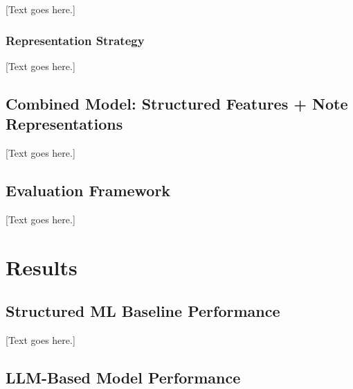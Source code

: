 \documentclass[12pt, a4paper]{article}
\begin{document}
[Text goes here.]

\subsubsection{Representation Strategy}

[Text goes here.]

\subsection{Combined Model: Structured Features + Note Representations}

[Text goes here.]

\subsection{Evaluation Framework}

[Text goes here.]

\section{Results}

\subsection{Structured ML Baseline Performance}

[Text goes here.]

\subsection{LLM-Based Model Performance}
\end{document}
